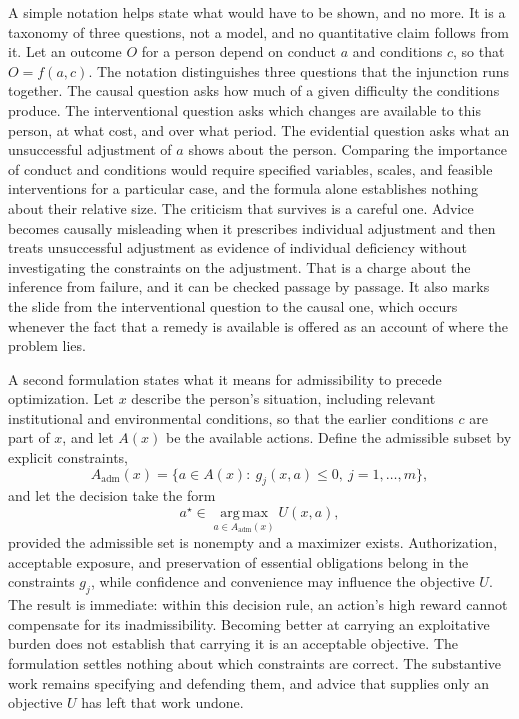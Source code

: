 \documentclass[12pt]{article}
\begin{document}
A simple notation helps state what would have to be shown, and no more. It is a taxonomy of three questions, not a model, and no quantitative claim follows from it. Let an outcome $O$ for a person depend on conduct $a$ and conditions $c$, so that $O = f(a,c)$. The notation distinguishes three questions that the injunction runs together. The causal question asks how much of a given difficulty the conditions produce. The interventional question asks which changes are available to this person, at what cost, and over what period. The evidential question asks what an unsuccessful adjustment of $a$ shows about the person. Comparing the importance of conduct and conditions would require specified variables, scales, and feasible interventions for a particular case, and the formula alone establishes nothing about their relative size. The criticism that survives is a careful one. Advice becomes causally misleading when it prescribes individual adjustment and then treats unsuccessful adjustment as evidence of individual deficiency without investigating the constraints on the adjustment. That is a charge about the inference from failure, and it can be checked passage by passage. It also marks the slide from the interventional question to the causal one, which occurs whenever the fact that a remedy is available is offered as an account of where the problem lies.

A second formulation states what it means for admissibility to precede optimization. Let $x$ describe the person's situation, including relevant institutional and environmental conditions, so that the earlier conditions $c$ are part of $x$, and let $A(x)$ be the available actions. Define the admissible subset by explicit constraints,
\[
A_{\mathrm{adm}}(x)=\{a\in A(x):\ g_j(x,a)\le 0,\ j=1,\ldots,m\},
\]
and let the decision take the form
\[
a^\star\in\operatorname*{arg\,max}_{a\in A_{\mathrm{adm}}(x)} U(x,a),
\]
provided the admissible set is nonempty and a maximizer exists. Authorization, acceptable exposure, and preservation of essential obligations belong in the constraints $g_j$, while confidence and convenience may influence the objective $U$. The result is immediate: within this decision rule, an action's high reward cannot compensate for its inadmissibility. Becoming better at carrying an exploitative burden does not establish that carrying it is an acceptable objective. The formulation settles nothing about which constraints are correct. The substantive work remains specifying and defending them, and advice that supplies only an objective $U$ has left that work undone.
\end{document}
